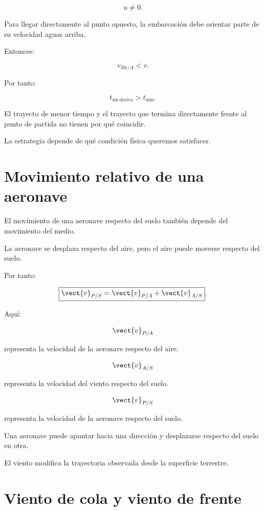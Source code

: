 \[
u\neq0.
\]

Para llegar directamente al punto opuesto,
la embarcación debe orientar parte de su
velocidad aguas arriba.

Entonces:

\[
v_{Bx/A}<v.
\]

Por tanto:

\[
t_{\mathrm{sin\ deriva}}>t_{\min}.
\]

\begin{idea}

El trayecto de menor tiempo y el trayecto
que termina directamente frente al punto
de partida no tienen por qué coincidir.

La estrategia depende de qué condición
física queremos satisfacer.

\end{idea}


\section{Movimiento relativo de una aeronave}

El movimiento de una aeronave respecto del suelo
también depende del movimiento del medio.

La aeronave se desplaza respecto del aire,
pero el aire puede moverse respecto del suelo.

Por tanto:

\[
\boxed{
\vect{v}_{P/S}
=
\vect{v}_{P/A}
+
\vect{v}_{A/S}
}.
\]

Aquí:

\[
\vect{v}_{P/A}
\]

representa la velocidad de la aeronave
respecto del aire.

\[
\vect{v}_{A/S}
\]

representa la velocidad del viento respecto del suelo.

\[
\vect{v}_{P/S}
\]

representa la velocidad de la aeronave
respecto del suelo.

\begin{interpretacion}

Una aeronave puede apuntar hacia una dirección
y desplazarse respecto del suelo en otra.

El viento modifica la trayectoria observada
desde la superficie terrestre.

\end{interpretacion}


\section{Viento de cola y viento de frente}


